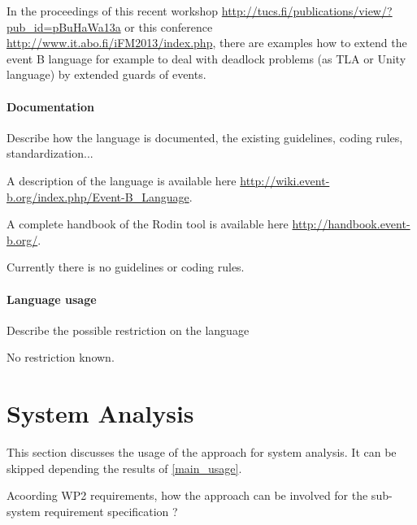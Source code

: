 \begin{author_comment}
In the proceedings of this recent workshop \url{http://tucs.fi/publications/view/?pub_id=pBuHaWa13a} or this conference \url{http://www.it.abo.fi/iFM2013/index.php}, there are examples how to extend the event B language for example to deal with deadlock problems (as TLA or Unity language) by extended guards of events.
\end{author_comment}

\paragraph{Documentation} Describe how the language is documented, the existing guidelines, coding rules, standardization...

\begin{author_comment}
A description of the language is available here \url{http://wiki.event-b.org/index.php/Event-B_Language}.

A complete handbook of the Rodin tool is available  here \url{http://handbook.event-b.org/}.

Currently there is no guidelines or coding rules.
\end{author_comment}

\paragraph{Language usage} Describe the possible restriction on the language

\begin{author_comment}
No restriction known.
\end{author_comment}

\section{System Analysis}
This section discusses the usage of the approach for system analysis.
It can be skipped depending the results of \ref{main_usage}.

Acoording WP2 requirements, how the approach can be involved for the sub-system requirement specification ?

